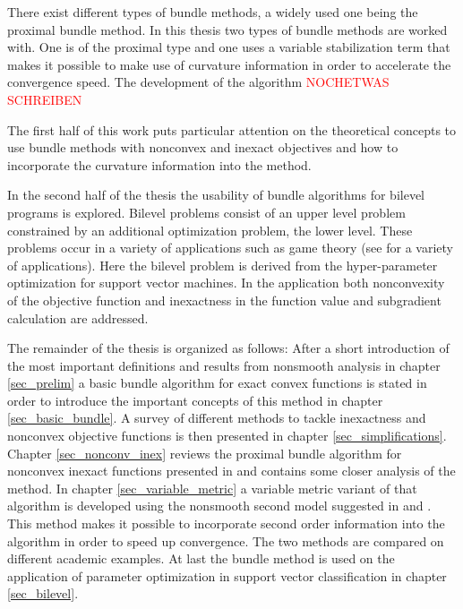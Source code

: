There exist different types of bundle methods, a widely used one being the proximal bundle method.
In this thesis two types of bundle methods are worked with. One is of the proximal type and one uses a variable stabilization term that makes it possible to make use of curvature information in order to accelerate the convergence speed.
The development of the algorithm \textcolor{red}{NOCHETWAS SCHREIBEN}

The first half of this work puts particular attention on the theoretical concepts to use bundle methods with nonconvex and inexact objectives and how to incorporate the curvature information into the method.

In the second half of the thesis the usability of bundle algorithms for bilevel programs is explored. Bilevel problems consist of an upper level problem constrained by an additional optimization problem, the lower level.
These problems occur in a variety of applications such as game theory (see \cite[section 2.1]{Colson2007} for a variety of applications).
Here the bilevel problem is derived from the hyper-parameter optimization for support vector machines. 
In the application both nonconvexity of the objective function and inexactness in the function value and subgradient calculation are addressed.

The remainder of the thesis is organized as follows:
After a short introduction of the most important definitions and results from nonsmooth analysis in chapter \ref{sec_prelim} a basic bundle algorithm for exact convex functions is stated in order to introduce the important concepts of this method in chapter \ref{sec_basic_bundle}. A survey of different methods to tackle inexactness and nonconvex objective functions is then presented in chapter \ref{sec_simplifications}.
Chapter \ref{sec_nonconv_inex} reviews the proximal bundle algorithm for nonconvex inexact functions presented in \cite{Hare2016} and contains some closer analysis of the method. In chapter \ref{sec_variable_metric} a variable metric variant of that algorithm is developed using the nonsmooth second model suggested in \cite{Noll2012} and \cite{Noll2013}.
This method makes it possible to incorporate second order information into the algorithm in order to speed up convergence.
The two methods are compared on different academic examples.
At last the bundle method is used on the application of parameter optimization in support vector classification in chapter \ref{sec_bilevel}.  

 

